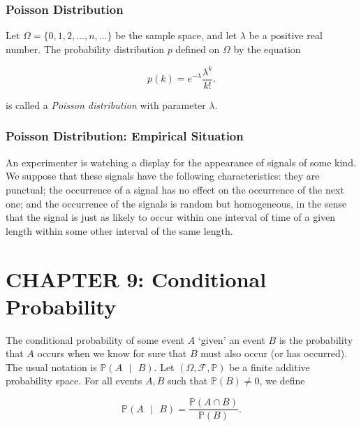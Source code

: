 \documentclass[12pt]{article}
\newcommand{\prob}[1]{\mathbb{P}(#1)}
\newcommand{\condprob}[2]{\mathbb{P}(#1 \text{ } \lvert \text{ } #2)}
\newcommand{\field}{\mathcal{F}}
\begin{document}
\subsubsection*{Poisson Distribution}
\noindent
Let $\Omega = \{ 0, 1, 2, \ldots, n, \ldots \}$ be the sample space, and let $\lambda$ be a positive real number. The probability distribution $p$ defined on $\Omega$ by the equation

\begin{equation*}
p(k) = e^{- \lambda} \frac{\lambda^k}{k!}.
\end{equation*}

\noindent
is called a \textit{Poisson distribution} with parameter $\lambda$. 

\subsubsection*{Poisson Distribution: Empirical Situation}
\noindent
An experimenter is watching a display for the appearance of signals of some kind. We suppose that these signals have the following characteristics: they are punctual; the occurrence of a signal has no effect on the occurrence of the next one; and the occurrence of the signals is random but homogeneous, in the sense that the signal is just as likely to occur within one interval of time of a given length within some other interval of the same length. 

\section*{CHAPTER 9: Conditional Probability}


\noindent
The conditional probability of some event $A$ `given' an event $B$ is the probability that $A$ occurs when we know for sure that $B$ must also occur (or has occurred). The usual notation is $\condprob{A}{B}$. Let $(\Omega, \field, \mathbb{P})$ be a finite additive probability space. For all events $A,B$ such that $\prob{B} \neq 0$, we define

\begin{equation*}
\condprob{A}{B} = \frac{\prob{A \cap B}}{\prob{B}}.
\end{equation*}
\end{document}
